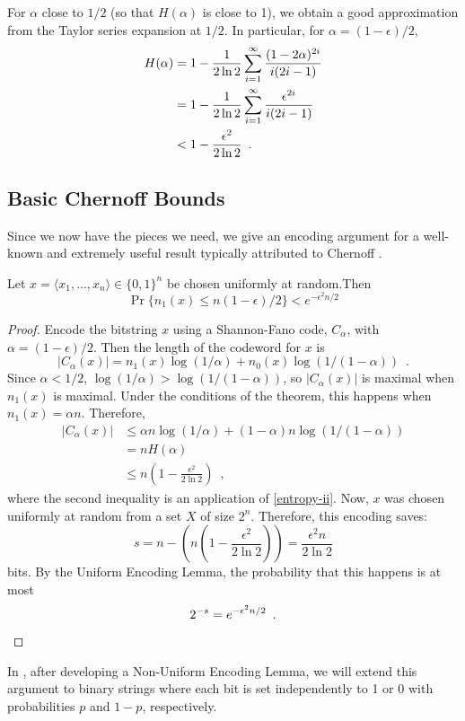 \documentclass{patmorin}
\begin{document}
For $\alpha$ close to $1/2$ (so that $H(\alpha)$ is close to 1), we
obtain a good approximation from the Taylor series expansion at $1/2$. In
particular, for $\alpha=(1-\epsilon)/2$,
\begin{align}
   H(\alpha) & = 1-\frac{1}{2\ln 2}\sum_{i=1}^{\infty}\frac{(1-2\alpha)^{2i}}{i(2i-1)} 
            \notag \\ 
        & = 1-\frac{1}{2\ln 2}\sum_{i=1}^{\infty}\frac{\epsilon^{2i}}{i(2i-1)} 
             \notag \\ 
        & < 1-\frac{\epsilon^2}{2\ln 2} \enspace .\eqlabel{entropy-ii}
\end{align}

\subsection{Basic Chernoff Bounds}

Since we now have the pieces we need, we give an encoding argument
for a well-known and extremely useful result typically attributed to
Chernoff \cite{X}.

\begin{thm}\label{chernoff-basic}
  Let $x=\langle x_1,\ldots,x_n\rangle\in\{0,1\}^n$ be chosen uniformly
  at random.Then
  \[  \Pr\{n_1(x) \le n(1-\epsilon)/2\} < e^{-\epsilon^2n/2} \]
\end{thm}

\begin{proof}
Encode the bitstring $x$ using a Shannon-Fano code, $C_\alpha$, with
$\alpha=(1-\epsilon)/2$.  Then the length of the codeword for $x$ is
\[
     |C_\alpha(x)| = n_1(x)\log(1/\alpha) + n_0(x)\log (1/(1-\alpha))  \enspace .
\]
Since $\alpha < 1/2$, $\log(1/\alpha) > \log(1/(1-\alpha))$, so
$|C_\alpha(x)|$ is maximal when $n_1(x)$ is maximal.  Under the conditions
of the theorem, this happens when $n_1(x)=\alpha n$.  Therefore,
\begin{align*}
  |C_\alpha(x)| & \le \alpha n\log(1/\alpha) + (1-\alpha)n\log(1/(1-\alpha))\\
                & = n H(\alpha) \\
                & \le n\left(1-\frac{\epsilon^2}{2\ln 2}\right) \enspace ,
\end{align*}
where the second inequality is an application of \eqref{entropy-ii}.
Now, $x$ was chosen uniformly at random from a set $X$ of size $2^n$.
Therefore, this encoding saves:
\[  
    s = n-\left(n\left(1-\frac{\epsilon^2}{2\ln 2}\right)\right)
      = \frac{\epsilon^2n}{2\ln 2} 
\]
bits.  By the Uniform Encoding Lemma, the probability that this happens
is at most
\[
     2^{-s} = e^{-\epsilon^2n/2} \enspace . \qedhere
\]
\end{proof}
In , after developing a Non-Uniform Encoding Lemma,
we will extend this argument to binary strings where each bit is set
independently to 1 or 0 with probabilities $p$ and $1-p$, respectively.
\end{document}
